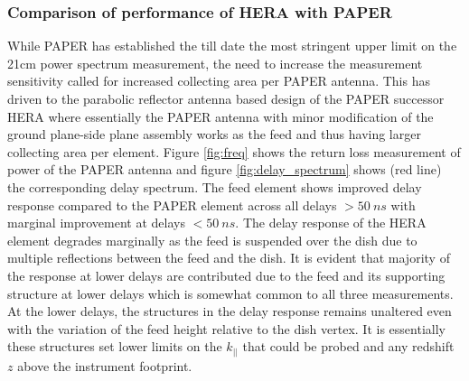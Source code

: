\documentclass[twocolumn]{emulateapj}
\begin{document}
\subsubsection{\textbf{Comparison of performance of HERA with PAPER}}
While PAPER has established the till date the most stringent upper limit on the 21cm power spectrum measurement, the need to increase the measurement sensitivity called for increased collecting area per PAPER antenna. This has driven to the parabolic reflector antenna based design of the PAPER successor HERA where essentially the PAPER antenna with minor modification of the ground plane-side plane assembly works as the feed and thus having larger collecting area per element. Figure \ref{fig:freq} shows the return loss measurement of power of the PAPER antenna and figure \ref{fig:delay_spectrum} shows (red line) the corresponding delay spectrum. The feed element shows improved delay response compared to the PAPER element across all delays $>50~ns$ with marginal improvement at delays $<50~ns$. The delay response of the HERA element degrades marginally as the feed is suspended over the dish due to multiple reflections between the feed and the dish.  It is evident that majority of the response at lower delays are contributed due to the feed and its supporting structure at lower delays which is somewhat common to all three measurements. At the lower delays, the structures in the delay response remains unaltered even with the variation of the feed height relative to the dish vertex. It is essentially these structures set lower limits on the $k_{||}$ that could be probed and any redshift $z$ above the instrument footprint. 

\end{document}
